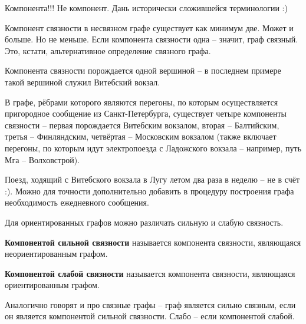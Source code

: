 \begin{remark}
	Компонента!!! Не компонент. Дань исторически сложившейся терминологии :)
\end{remark}

\begin{remark}
	Компонент связности в несвязном графе существует как минимум две. Может и больше. Но не меньше. Если компонента связности одна -- значит, граф связный. Это, кстати, альтернативное определение связного графа.
\end{remark}

\begin{remark}
	Компонента связности порождается одной вершиной -- в последнем примере такой вершиной служил Витебский вокзал.
\end{remark}

\begin{example}
	В графе, рёбрами которого являются перегоны, по которым осуществляется пригородное сообщение из Санкт-Петербурга, существует четыре компоненты связности -- первая порождается Витебским вокзалом, вторая -- Балтийским, третья -- Финляндским, четвёртая -- Московским вокзалом (также включает перегоны, по которым идут электропоезда с Ладожского вокзала -- например, путь Мга -- Волховстрой).
\end{example}

\begin{remark}
	Поезд, ходящий с Витебского вокзала в Лугу летом два раза в неделю -- не в счёт :). Можно для точности дополнительно добавить в процедуру построения графа необходимость ежедневного сообщения.
\end{remark}

Для ориентированных графов можно различать сильную и слабую связность.
\begin{definition}
	\textbf{Компонентой сильной связности} называется компонента связности, являющаяся неориентированным графом.
\end{definition}

\begin{definition}
	\textbf{Компонентой слабой связности} называется компонента связности, являющаяся ориентированным графом.
\end{definition}

\begin{definition}
	Аналогично говорят и про связные графы -- граф является сильно связным, если он является компонентой сильной связности. Слабо -- если компонентой слабой.
\end{definition}

